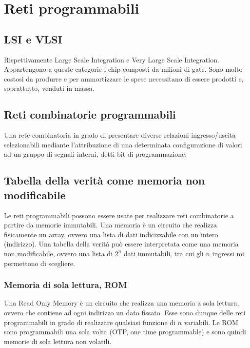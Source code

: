 \documentclass{subfiles}
\begin{document}
\section{Reti programmabili}

\subsection{LSI e VLSI}

Rispettivamente Large Scale Integration e Very Large Scale Integration.
Appartengono a queste categorie i chip composti da milioni di gate.
Sono molto costosi da produrre e per ammortizzare le spese necessitano di essere prodotti e, soprattutto, venduti in massa.

\subsection{Reti combinatorie programmabili}

Una rete combinatoria in grado di presentare diverse relazioni ingresso/uscita selezionabili mediante l'attribuzione di una determinata configurazione di valori ad un gruppo di segnali interni, detti bit di programmazione.

\subsection{Tabella della verità come memoria non modificabile}

Le reti programmabili possono essere usate per realizzare reti combinatorie a partire da memorie immutabili.
Una memoria è un circuito che realizza fisicamente un array, ovvero una lista di dati indicizzabile con un intero (indirizzo).
Una tabella della verità può essere interpretata come una memoria non modificabile, ovvero una lista di $2^n$ dati immutabili, tra cui gli $n$ ingressi mi permettono di scegliere.

\subsubsection{Memoria di sola lettura, ROM}

Una Read Only Memory è un circuito che realizza una memoria a sola lettura, ovvero che contiene ad ogni indirizzo un dato fissato.
Esse sono dunque delle reti programmabili in grado di realizzare qualsiasi funzione di $n$ variabili.
Le ROM sono programmabili una sola volta (OTP, one time programmable) e sono quindi memorie di sola lettura non volatili.
\end{document}
